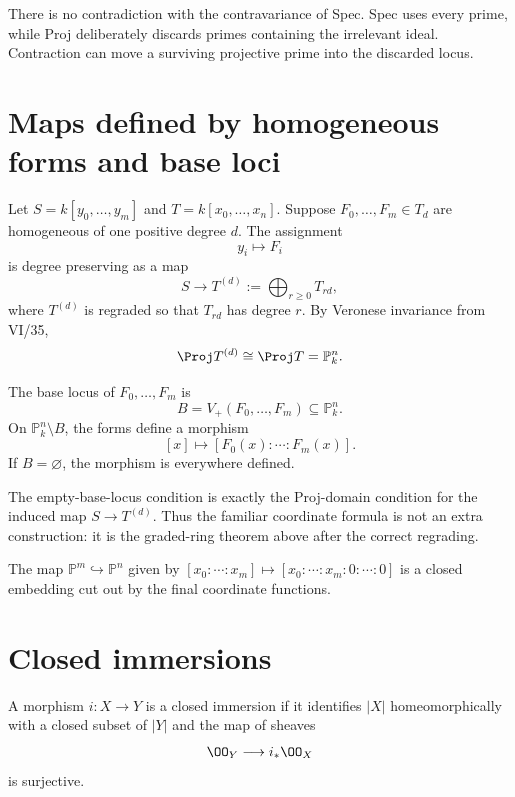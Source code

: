 \begin{remark}
There is no contradiction with the contravariance of Spec.  Spec uses every prime, while Proj deliberately discards primes containing the irrelevant ideal.  Contraction can move a surviving projective prime into the discarded locus.
\end{remark}

\section{Maps defined by homogeneous forms and base loci}
Let \(S=k[y_0,\ldots,y_m]\) and \(T=k[x_0,\ldots,x_n]\).  Suppose \(F_0,\ldots,F_m\in T_d\) are homogeneous of one positive degree \(d\).  The assignment
\[
  y_i\longmapsto F_i
\]
is degree preserving as a map
\[
  S\longrightarrow T^{(d)}:=\bigoplus_{r\ge0}T_{rd},
\]
where \(T^{(d)}\) is regraded so that \(T_{rd}\) has degree \(r\).  By Veronese invariance from VI/35,
\[
  \Proj T^{(d)}\cong\Proj T=\mathbb P^n_k.
\]

\begin{definition}\label{def:vi38-base-locus}
The base locus of \(F_0,\ldots,F_m\) is
\[
  B=V_+(F_0,\ldots,F_m)\subseteq\mathbb P^n_k.
\]
On \(\mathbb P^n_k\setminus B\), the forms define a morphism
\[
  [x]\longmapsto[F_0(x):\cdots:F_m(x)].
\]
If \(B=\varnothing\), the morphism is everywhere defined.
\end{definition}

The empty-base-locus condition is exactly the Proj-domain condition for the induced map \(S\to T^{(d)}\).  Thus the familiar coordinate formula is not an extra construction: it is the graded-ring theorem above after the correct regrading.



\begin{example}\label{ex:vi38-expand-01}
The map $\mathbb P^m\hookrightarrow\mathbb P^n$ given by $[x_0:\cdots:x_m]\mapsto[x_0:\cdots:x_m:0:\cdots:0]$ is a closed embedding cut out by the final coordinate functions.
\end{example}
\section{Closed immersions}
\begin{definition}\label{def:vi38-closed-immersion}
A morphism \(i:X\to Y\) is a closed immersion if it identifies \(|X|\) homeomorphically with a closed subset of \(|Y|\) and the map of sheaves
\[
  \OO_Y\longrightarrow i_*\OO_X
\]
is surjective.
\end{definition}

